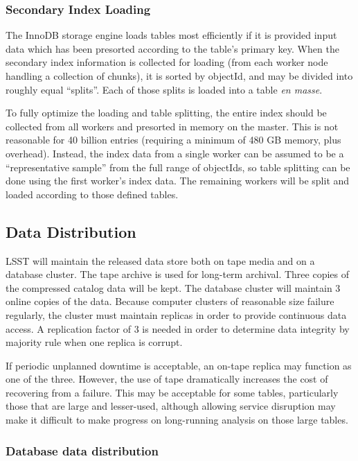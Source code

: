 \documentclass[DM,toc]{lsstdoc}
\begin{document}
\subsubsection{Secondary Index Loading}\label{secondary-index-loading}

The InnoDB storage engine loads tables most efficiently if it is
provided input data which has been presorted according to the table's
primary key. When the secondary index information is collected for
loading (from each worker node handling a collection of chunks), it is
sorted by objectId, and may be divided into roughly equal ``splits''.
Each of those splits is loaded into a table \emph{en masse}.

To fully optimize the loading and table splitting, the entire index
should be collected from all workers and presorted in memory on the
master. This is not reasonable for 40 billion entries (requiring a minimum
of 480 GB memory, plus overhead). Instead, the index data from a single
worker can be assumed to be a ``representative sample'' from the full
range of objectIds, so table splitting can be done using the first
worker's index data. The remaining workers will be split and loaded
according to those defined tables.

\subsection{Data Distribution}\label{data-distribution}

LSST will maintain the released data store both on tape media and on a
database cluster. The tape archive is used for long-term archival. Three
copies of the compressed catalog data will be kept. The database cluster will
maintain 3 online copies of the data. Because computer clusters of reasonable
size failure regularly, the cluster must maintain replicas in order to provide
continuous data access. A replication factor of 3 is needed in order to
determine data integrity by majority rule when one replica is corrupt.

If periodic unplanned downtime is acceptable, an on-tape replica may
function as one of the three. However, the use of tape dramatically
increases the cost of recovering from a failure. This may be acceptable
for some tables, particularly those that are large and lesser-used,
although allowing service disruption may make it difficult to make
progress on long-running analysis on those large tables.

\subsubsection{Database data
distribution}\label{database-data-distribution}
\end{document}
